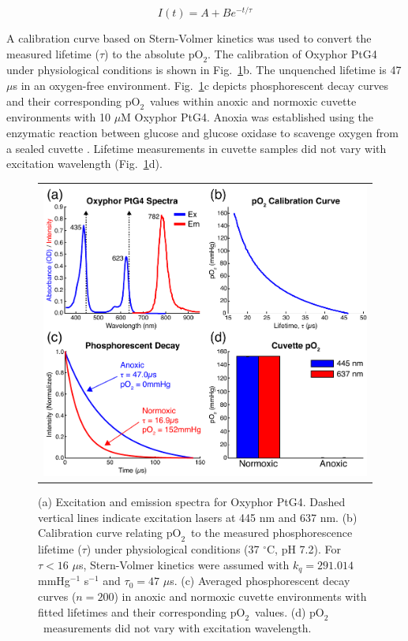 \documentclass[12pt]{spieman}  %
\newcommand*\rfrac[2]{{}{#1}\!/{#2}}                    %
\newcommand{\pO}{\ensuremath{\text{pO}_2}} 	            %
\begin{document}
\begin{spacing}{2}
\begin{equation}
    \label{eq:phosphorescence}
    I(t) = A + Be^{-\rfrac{t}{\tau}}
\end{equation}

A calibration curve based on Stern-Volmer kinetics \cite{Vanderkooi:1986hs,Wilson:2003ek} was used to convert the measured lifetime ($\tau$) to the absolute \pO. The calibration of Oxyphor PtG4 under physiological conditions is shown in Fig.~\ref{fig:oxyphor_ptg4}b. The unquenched lifetime is 47 $\mu$s in an oxygen-free environment. Fig.~\ref{fig:oxyphor_ptg4}c depicts phosphorescent decay curves and their corresponding \pO\ values within anoxic and normoxic cuvette environments with 10 $\mu$M Oxyphor PtG4. Anoxia was established using the enzymatic reaction between glucose and glucose oxidase to scavenge oxygen from a sealed cuvette \cite{Lo:1997he}. Lifetime measurements in cuvette samples did not vary with excitation wavelength (Fig.~\ref{fig:oxyphor_ptg4}d).

\begin{figure}
    \begin{center}
        \begin{tabular}{c}
            \includegraphics[width=6.25in]{Figure2.pdf}
        \end{tabular}
    \end{center}
    \caption {
        \label{fig:oxyphor_ptg4}
        (a) Excitation and emission spectra for Oxyphor PtG4. Dashed vertical lines indicate excitation lasers at 445 nm and 637 nm. (b) Calibration curve relating \pO\ to the measured phosphorescence lifetime ($\tau$) under physiological conditions (37 $^\circ$C, pH 7.2). For $\tau < 16$ $\mu$s, Stern-Volmer kinetics were assumed with $k_q = 291.014$ mmHg$^{-1}$ s$^{-1}$ and $\tau_0 = 47$ $\mu$s. (c) Averaged phosphorescent decay curves ($n = 200$) in anoxic and normoxic cuvette environments with fitted lifetimes and their corresponding \pO\ values. (d) \pO\ measurements did not vary with excitation wavelength.
    }
\end{figure}


\end{spacing}
\end{document}
